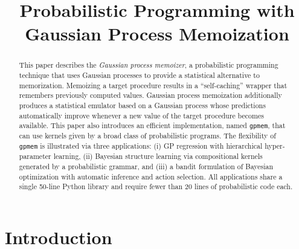 \documentclass[twoside,11pt]{article}
\newcommand{\myparagraph}[1]{\paragraph{#1}\mbox{}\\}
\begin{document}
\title{Probabilistic Programming with Gaussian Process Memoization}


\author{}


\maketitle
\begin{abstract}
This paper describes the {\em Gaussian process memoizer}, a probabilistic programming technique that uses Gaussian processes to provide a statistical alternative to memorization. Memoizing a target procedure results in a “self-caching” wrapper that remembers previously computed values. Gaussian process memoization additionally produces a statistical emulator based on a Gaussian process whose predictions automatically improve whenever a new value of the target procedure becomes available. This paper also introduces  an efficient implementation, named {\tt gpmem}, that can use kernels given by a broad class of probabilistic programs. The flexibility of {\tt gpmem} is illustrated via three applications: (i) GP regression with hierarchical hyper-parameter learning, (ii) Bayesian structure learning via compositional kernels generated by a probabilistic grammar, and (iii) a bandit formulation of Bayesian optimization with automatic inference and action selection. All applications share a single 50-line Python library and require fewer than 20 lines of probabilistic code each.
\end{abstract}

\section{Introduction}

%
%

%
\end{document}

